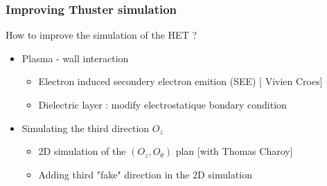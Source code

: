 \documentclass[sans, aspectratio=169]{beamer}
\begin{document}
\begin{frame} 
\frametitle{Improving Thuster simulation} 

How to improve the simulation of the HET ? \pause
\begin{itemize}
	\item Plasma - wall interaction
	\begin{itemize}
		\item Electron induced secondery electron emition (SEE) [ Vivien Croes]
		\item<alert@2> Dielectric layer : modify electrostatique bondary condition
	\end{itemize}
	\item Simulating the third direction $O_z$
	\begin{itemize}
		\item<alert@2> 2D simulation of the $(O_z, O_{\theta})$ plan [with Thomas Charoy]
		\item<alert@2> Adding third "fake" direction in the 2D simulation
	\end{itemize}

\end{itemize}
\end{frame}
\end{document}
